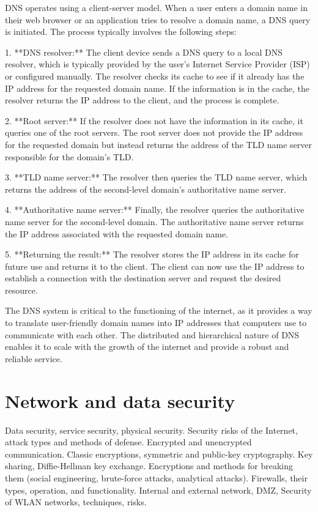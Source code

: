 \documentclass{article}
\begin{document}
DNS operates using a client-server model. When a user enters a domain name in their web browser or an application tries to resolve a domain name, a DNS query is initiated. The process typically involves the following steps:

1. **DNS resolver:** The client device sends a DNS query to a local DNS resolver, which is typically provided by the user's Internet Service Provider (ISP) or configured manually. The resolver checks its cache to see if it already has the IP address for the requested domain name. If the information is in the cache, the resolver returns the IP address to the client, and the process is complete.

2. **Root server:** If the resolver does not have the information in its cache, it queries one of the root servers. The root server does not provide the IP address for the requested domain but instead returns the address of the TLD name server responsible for the domain's TLD.

3. **TLD name server:** The resolver then queries the TLD name server, which returns the address of the second-level domain's authoritative name server.

4. **Authoritative name server:** Finally, the resolver queries the authoritative name server for the second-level domain. The authoritative name server returns the IP address associated with the requested domain name.

5. **Returning the result:** The resolver stores the IP address in its cache for future use and returns it to the client. The client can now use the IP address to establish a connection with the destination server and request the desired resource.

The DNS system is critical to the functioning of the internet, as it provides a way to translate user-friendly domain names into IP addresses that computers use to communicate with each other. The distributed and hierarchical nature of DNS enables it to scale with the growth of the internet and provide a robust and reliable service.


\section{Network and data security}

Data security, service security, physical security. Security risks of the Internet, attack types and methods of defense. Encrypted and unencrypted communication. Classic encryptions, symmetric and public-key cryptography. Key sharing, Diffie-Hellman key exchange. Encryptions and methods for breaking them (social engineering, brute-force attacks, analytical attacks). Firewalls, their types, operation, and functionality. Internal and external network, DMZ, Security of WLAN networks, techniques, risks.
\end{document}

